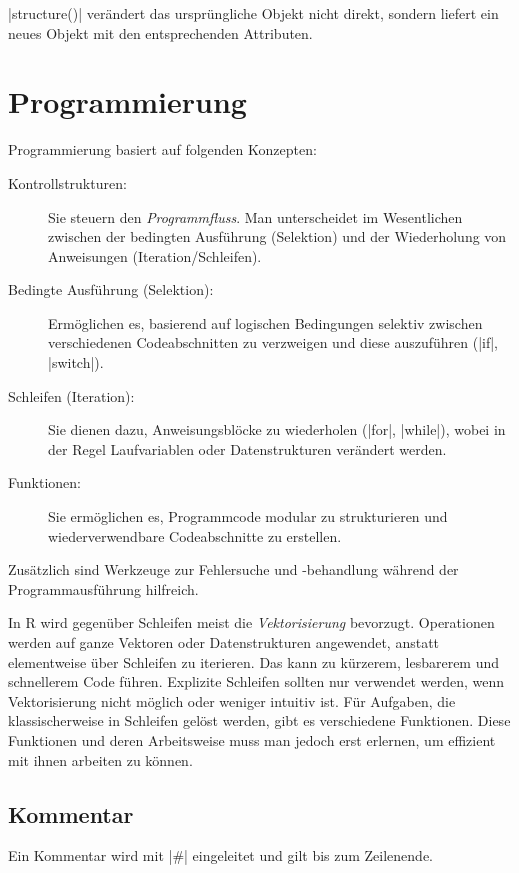 \documentclass[10pt,twocolumn]{scrartcl}
\renewcommand{\lstinline}{\mycoloredinline}
\begin{document}
\lstinline|structure()| verändert das ursprüngliche Objekt nicht direkt, sondern liefert ein neues Objekt mit den entsprechenden Attributen.


\section{Programmierung}

Programmierung basiert auf folgenden Konzepten:

\begin{description}
\item[Kontrollstrukturen:] Sie steuern den \emph{Programmfluss}. Man unterscheidet im Wesentlichen zwischen der bedingten Ausführung (Selektion) und der Wiederholung von Anweisungen (Iteration/Schleifen).
\item[Bedingte Ausführung (Selektion):] Ermöglichen es, basierend auf logischen Bedingungen selektiv zwischen verschiedenen Codeabschnitten zu verzweigen und diese auszuführen (\lstinline|if|, \lstinline|switch|).
\item[Schleifen (Iteration):] Sie dienen dazu, Anweisungsblöcke zu wiederholen (\lstinline|for|, \lstinline|while|), wobei in der Regel Laufvariablen oder Datenstrukturen verändert werden.
\item[Funktionen:] Sie ermöglichen es, Programmcode modular zu strukturieren und wiederverwendbare Codeabschnitte zu erstellen.
\end{description}

Zusätzlich sind Werkzeuge zur Fehlersuche und -behandlung während der Programmausführung hilfreich.

In R wird gegenüber Schleifen meist die \emph{Vektorisierung} bevorzugt. Operationen werden auf ganze Vektoren oder Datenstrukturen angewendet, anstatt elementweise über Schleifen zu iterieren. Das kann zu kürzerem, lesbarerem und schnellerem Code führen. Explizite Schleifen sollten nur verwendet werden, wenn Vektorisierung nicht möglich oder weniger intuitiv ist. Für Aufgaben, die klassischerweise in Schleifen gelöst werden, gibt es verschiedene Funktionen. Diese Funktionen und deren Arbeitsweise muss man jedoch erst erlernen, um effizient mit ihnen arbeiten zu können.


\subsection{Kommentar}

Ein Kommentar wird mit \lstinline|#| eingeleitet und gilt bis zum Zeilenende. 
\end{document}
